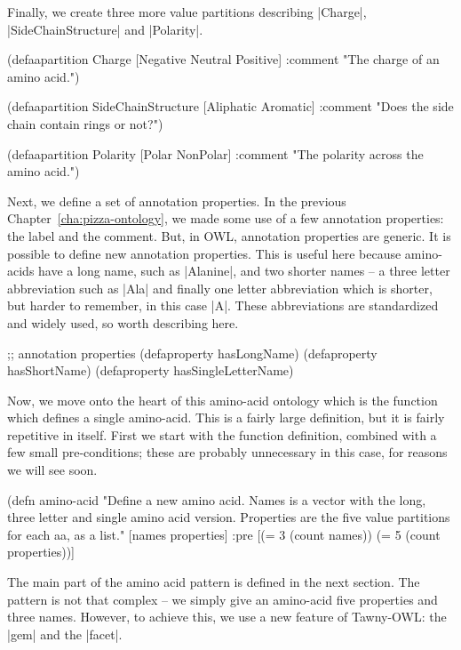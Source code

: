 Finally, we create three more value partitions describing |Charge|,
|SideChainStructure| and |Polarity|.

\begin{tawny}
(defaapartition Charge
  [Negative Neutral Positive]
  :comment "The charge of an amino acid.")

(defaapartition SideChainStructure
  [Aliphatic Aromatic]
  :comment "Does the side chain contain rings or not?")

(defaapartition Polarity
  [Polar NonPolar]
  :comment "The polarity across the amino acid.")
\end{tawny}

Next, we define a set of annotation properties. In the previous
Chapter~\ref{cha:pizza-ontology}, we made some use of a few annotation
properties: the label and the comment. But, in OWL, annotation
properties are generic. It is possible to define new annotation
properties. This is useful here because amino-acids have a long name,
such as |Alanine|, and two shorter names -- a three letter abbreviation such
as |Ala| and finally one letter abbreviation which is shorter, but harder to
remember, in this case |A|. These abbreviations are standardized and
widely used, so worth describing here.

\begin{tawny}
;; annotation properties
(defaproperty hasLongName)
(defaproperty hasShortName)
(defaproperty hasSingleLetterName)
\end{tawny}

Now, we move onto the heart of this amino-acid ontology which is the function
which defines a single amino-acid. This is a fairly large definition, but it
is fairly repetitive in itself. First we start with the function definition,
combined with a few small pre-conditions; these are probably unnecessary in
this case, for reasons we will see soon.

\begin{tawny}
(defn amino-acid
  "Define a new amino acid. Names is a vector with the long, three letter and
  single amino acid version. Properties are the five value partitions for each
  aa, as a list."
  [names properties]
  {:pre [(= 3 (count names))
         (= 5 (count properties))]}
\end{tawny}

The main part of the amino acid pattern is defined in the next section. The
pattern is not that complex -- we simply give an amino-acid five properties
and three names. However, to achieve this, we use a new feature of
Tawny-OWL: the |gem| and the |facet|.

